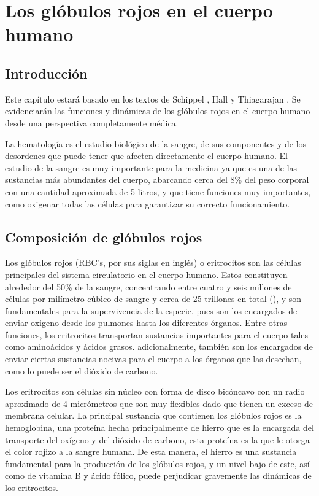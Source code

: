 \chapter{Los glóbulos rojos en el cuerpo humano}\label{chap:RBC}
\section{Introducción}\label{sec:RBC:intro}
Este capítulo estará basado en los textos de Schippel \cite{schippel2023dynamics}, Hall \cite{hall2021guyton} y Thiagarajan \cite{thiagarajan2021red}. Se evidenciarán las funciones y dinámicas de los glóbulos rojos en el cuerpo humano desde una perspectiva completamente médica.

La hematología es el estudio biológico de la sangre, de sus componentes y de los desordenes que puede tener que afecten directamente el cuerpo humano. El estudio de la sangre es muy importante para la medicina ya que es una de las sustancias más abundantes del cuerpo, abarcando cerca del 8\% del peso corporal con una cantidad aproximada de 5 litros, y que tiene funciones muy importantes, como oxigenar todas las células para garantizar su correcto funcionamiento.

\section{Composición de glóbulos rojos}\label{sec:RBC:Composicion}
Los glóbulos rojos (RBC's, por sus siglas en inglés) o eritrocitos son las células principales del sistema circulatorio en el cuerpo humano. Estos constituyen alrededor del 50\% de la sangre, concentrando entre cuatro y seis millones de células por milímetro cúbico de sangre y cerca de 25 trillones en total (\cite{enwiki:1217153817}), y son fundamentales para la supervivencia de la especie, pues son los encargados de enviar oxigeno desde los pulmones hasta los diferentes órganos. Entre otras funciones, los eritrocitos transportan sustancias importantes para el cuerpo tales como aminoácidos y ácidos grasos. adicionalmente, también son los encargados de enviar ciertas sustancias nocivas para el cuerpo a los órganos que las desechan, como lo puede ser el dióxido de carbono.

Los eritrocitos son células sin núcleo con forma de disco bicóncavo con un radio aproximado de 4 micrómetros que son muy flexibles dado que tienen un exceso de membrana celular. La principal sustancia que contienen los glóbulos rojos es la hemoglobina, una proteína hecha principalmente de hierro que es la encargada del transporte del oxígeno y del dióxido de carbono, esta proteína es la que le otorga el color rojizo a la sangre humana. De esta manera, el hierro es una sustancia fundamental para la producción de los glóbulos rojos, y un nivel bajo de este, así como de vitamina B y ácido fólico, puede perjudicar gravemente las dinámicas de los eritrocitos.

